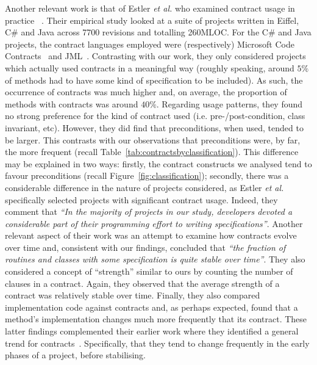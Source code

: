 \documentclass[a4paper,UKenglish]{lipics-v2016}
\begin{document}
Another relevant work is that of Estler {\em et al.} who examined contract usage in practice ~\cite{EFNPM14}.  Their empirical study looked at a suite of projects written in Eiffel, C\# and Java across 7700 revisions and totalling 260MLOC.  For the C\# and Java projects, the contract languages employed were (respectively) Microsoft Code Contracts~\cite{CodeContracts} and JML~\cite{LCCRC05}.  Contrasting with our work, they only considered projects which actually used contracts in a meaningful way (roughly speaking, around $5\%$ of methods had to have some kind of specification to be included).  As such, the occurrence of contracts was much higher and, on average, the proportion of methods with contracts was around $40\%$.  Regarding usage patterns, they found no strong preference for the kind of contract used (i.e. pre-/post-condition, class invariant, etc).  However, they did find that preconditions, when used, tended to be larger.   This contrasts with our observations that preconditions were, by far, the more frequent (recall Table~\ref{tab:contractsbyclassification}).  This difference may be explained in two ways:  firstly, the contract constructs we analysed tend to favour preconditions (recall Figure~\ref{fig:classification});  secondly, there was a considerable difference in the nature of projects considered, as Estler {\em et al.} specifically selected projects with significant contract usage.  Indeed, they comment that {\em ``In the majority of projects in our study, developers devoted a considerable part of their programming effort to writing specifications''}.  Another relevant aspect of their work was an attempt to examine how contracts evolve over time and, consistent with our findings, concluded that {\em ``the fraction of routines and classes with some specification is quite stable over time''}.  They also considered a concept of ``strength'' similar to ours by counting the number of clauses in a contract.  Again, they observed that the average strength of a contract was relatively stable over time.  Finally, they also compared implementation code against contracts and, as perhaps expected, found that a method's implementation changes much more frequently that its contract.  These latter findings complemented their earlier work where they identified a general trend for contracts~\cite{EPFNM12}.  Specifically, that they tend to change frequently in the early phases of a project, before stabilising.  
\end{document}
